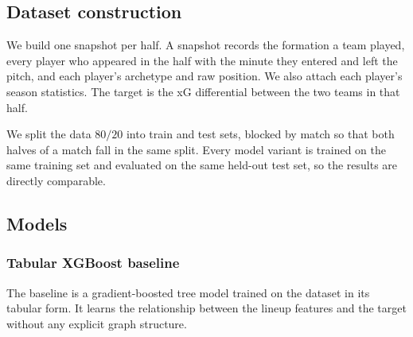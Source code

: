 \documentclass[11pt,twocolumn]{article}
\begin{document}
\subsection{Dataset construction}
We build one snapshot per half. A snapshot records the formation a team
played, every player who appeared in the half with the minute they
entered and left the pitch, and each player's archetype and raw position.
We also attach each player's season statistics. The target is the xG
differential between the two teams in that half.

We split the data $80/20$ into train and test sets, blocked by match so
that both halves of a match fall in the same split. Every model variant
is trained on the same training set and evaluated on the same held-out
test set, so the results are directly comparable.

\subsection{Models}

\subsubsection{Tabular XGBoost baseline}
The baseline is a gradient-boosted tree model trained on
the dataset in its tabular form. It learns the relationship between the
lineup features and the target without any explicit graph structure.
\end{document}
